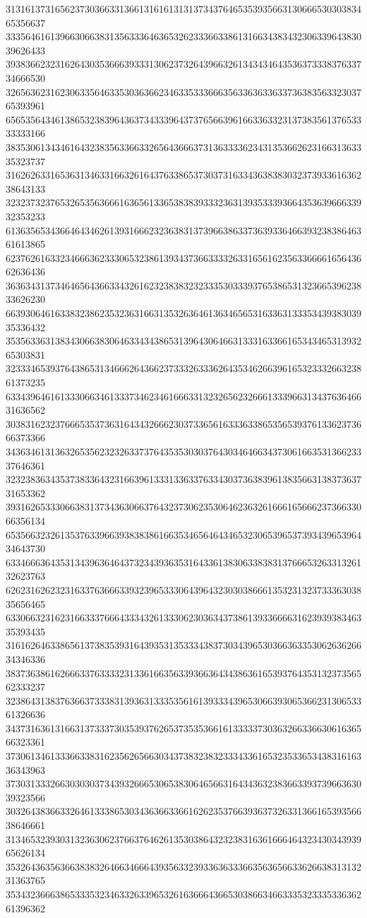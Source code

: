 31316137316562373036633136613161613131373437646535393566313066653030383465356637
33356461613966306638313563336463653262333663386131663438343230633964383039626433
39383662323162643035366639333130623732643966326134343464353637333837633734666530
32656362316230633564633530363662346335333666356336363363373638356332303765393961
65653564346138653238396436373433396437376566396166336332313738356137653333333166
38353061343461643238356336633265643666373136333362343135366262316631363335323737
31626263316536313463316632616437633865373037316334363838303237393361636238643133
32323732376532653563666163656133653838393332363139353339366435363966633932353233
61363565343664643462613931666232363831373966386337363933646639323838646361613865
62376261633234666362333065323861393437366333326331656162356336666165643662636436
36363431373464656436633432616232383832323335303339376538653132366539623833626230
66393064616338323862353236316631353263646136346565316336313335343938303935336432
35356336313834306638306463343438653139643064663133316336616534346531393265303831
32333465393764386531346662643662373332633362643534626639616532333266323861373235
63343964616133306634613337346234616663313232656232666133396631343763646631636562
30383162323766653537363164343266623037336561633363386535653937613362373666373366
34363461313632653562323263373764353530303764303464663437306166353136623337646361
32323836343537383364323166396133313363376334303736383961383566313837363731653362
39316265333066383137343630663764323730623530646236326166616566623736633066356134
65356632326135376339663938383861663534656464346532306539653739343965396434643730
63346663643531343963646437323439363531643361383063383831376665326331326132623763
62623162623231633763666339323965333064396432303038666135323132373336303835656465
63306632316231663337666433343261333062303634373861393366663162393938346335393435
31616264633865613738353931643935313533343837303439653036636335306263626634346336
38373638616266633763333231336166356339366364343863616539376435313237356562333237
32386431383763663733383139363133353561613933343965306639306536623130653361326636
34373163613166313733373035393762653735353661613333373036326633663061636566323361
37306134613336633831623562656630343738323832333433616532353365343831616336343963
37303133326630303037343932666530653830646566316434363238366339373966363039323566
30326438366332646133386530343636633661626235376639363732633136616539356638646661
31346532393031323630623766376462613530386432323831636166646432343034393965626134
35326436356366383832646634666439356332393363633366356365663362663831313231363765
35343236663865333532346332633965326163666436653038663466333532333533636261396362
